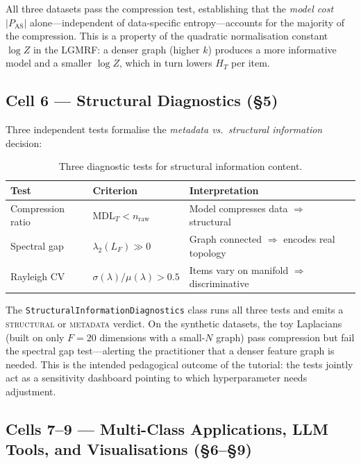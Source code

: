 \documentclass[12pt,a4paper]{article}
\theoremstyle{plain}
\theoremstyle{definition}
\theoremstyle{remark}
\newcommand{\1}{\mathbf{1}}
\begin{document}
	All three datasets pass the compression test, establishing that
	the \emph{model cost} $|P_\mathrm{AS}|$ alone---independent of
	data-specific entropy---accounts for the majority of the compression.
	This is a property of the quadratic normalisation constant $\log Z$
	in the LGMRF: a denser graph (higher $k$) produces a more informative
	model and a smaller $\log Z$, which in turn lowers $H_T$ per item.
	
	\subsection{Cell 6 --- Structural Diagnostics (§5)}
	
	Three independent tests formalise the
	\emph{metadata vs.\ structural information} decision:
	
	\begin{table}[H]
		\centering
		\caption{Three diagnostic tests for structural information content.}
		\label{tab:diagnostics}
		\begin{tabular}{lll}
			\toprule
			Test & Criterion & Interpretation \\
			\midrule
			Compression ratio  & $\mathrm{MDL}_T < n_\mathrm{raw}$
			& Model compresses data $\Rightarrow$ structural \\
			Spectral gap       & $\lambda_2(L_F) \gg 0$
			& Graph connected $\Rightarrow$ encodes real topology \\
			Rayleigh CV        & $\sigma(\lambda)/\mu(\lambda) > 0.5$
			& Items vary on manifold $\Rightarrow$ discriminative \\
			\bottomrule
		\end{tabular}
	\end{table}
	
	The \texttt{StructuralInformationDiagnostics} class runs all three tests
	and emits a \textsc{structural} or \textsc{metadata} verdict.
	On the synthetic datasets, the toy Laplacians (built on only $F=20$
	dimensions with a small-$N$ graph) pass compression but fail the
	spectral gap test---alerting the practitioner that a denser
	feature graph is needed.
	This is the intended pedagogical outcome of the tutorial: the tests
	jointly act as a sensitivity dashboard pointing to which hyperparameter
	needs adjustment.
	
	\subsection{Cells 7--9 --- Multi-Class Applications, LLM Tools, and Visualisations (§6--§9)}
	
\end{document}
